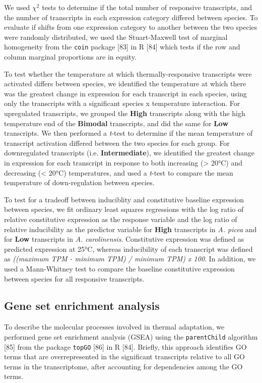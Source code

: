\documentclass[]{article}
\begin{document}
We used \(\chi^2\) tests to determine if the total number of responsive
transcripts, and the number of transcripts in each expression category
differed between species. To evaluate if shifts from one expression
category to another between the two species were randomly distributed,
we used the Stuart-Maxwell test of marginal homogeneity from the
\texttt{coin} package {[}83{]} in R {[}84{]} which tests if the row and
column marginal proportions are in equity.

To test whether the temperature at which thermally-responsive
transcripts were activated differs between species, we identified the
temperature at which there was the greatest change in expression for
each transcript in each species, using only the transcripts with a
significant species x temperature interaction. For upregulated
transcripts, we grouped the \textbf{High} transcripts along with the
high temperature end of the \textbf{Bimodal} transcripts, and did the
same for \textbf{Low} transcripts. We then performed a \emph{t}-test to
determine if the mean temperature of transcript activation differed
between the two species for each group. For downregulated transcripts
(i.e. \textbf{Intermediate}), we identified the greatest change in
expression for each transcript in response to both increasing
(\textgreater{} 20°C) and decreasing (\textless{} 20°C) temperatures,
and used a \emph{t}-test to compare the mean temperature of
down-regulation between species.

To test for a tradeoff between induciblity and constitutive baseline
expression between species, we fit ordinary least squares regressions
with the log ratio of relative constitutive expression as the response
variable and the log ratio of relative inducibility as the predictor
variable for \textbf{High} transcripts in \emph{A. picea} and for
\textbf{Low} transcripts in \emph{A. carolinensis}. Constitutive
expression was defined as predicted expression at 25°C, whereas
inducibility of each transcript was defined as \emph{((maximum TPM -
minimum TPM) / minimum TPM) x 100}. In addition, we used a Mann-Whitney
test to compare the baseline constitutive expression between species for
all responsive transcripts.

\subsection{Gene set enrichment
analysis}\label{gene-set-enrichment-analysis}

To describe the molecular processes involved in thermal adaptation, we
performed gene set enrichment analysis (GSEA) using the
\texttt{parentChild} algorithm {[}85{]} from the package \texttt{topGO}
{[}86{]} in R {[}84{]}. Briefly, this approach identifies GO terms that
are overrepresented in the significant transcripts relative to all GO
terms in the transcriptome, after accounting for dependencies among the
GO terms.
\end{document}
